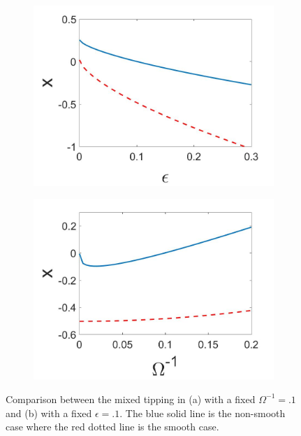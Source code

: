 \begin{figure}[H]
\centering
\begin{subfigure}{.5\textwidth}
 \centering
 \includegraphics[width=\linewidth]{conclusion/mixedcomp_eps.jpg}
 \caption{}
\end{subfigure}%
\begin{subfigure}{.5\textwidth}
 \centering
 \includegraphics[width=\linewidth]{conclusion/mixedcomp_omega.jpg}
 \caption{}
\end{subfigure}
\caption{Comparison between the mixed tipping in (a) with a fixed $\Omega^{-1}=.1$ and (b) with a fixed $\epsilon=.1$. The blue solid line is the non-smooth case where the red dotted line is the smooth case.}
\label{fig:mixed_comp}
\end{figure}

